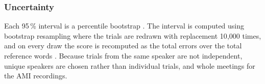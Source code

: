 \subsubsection{Uncertainty}
\label{sec:uncertainty}
Each 95\,\% interval is a percentile bootstrap \cite{efron1979bootstrap}. The interval is computed using bootstrap resampling where the trials are redrawn with replacement 10{,}000 times, and on every draw the score is recomputed as the total errors over the total reference words \cite{bisani2004bootstrap}. Because trials from the same speaker are not independent, unique speakers are chosen rather than individual trials, and whole meetings for the AMI recordings. 